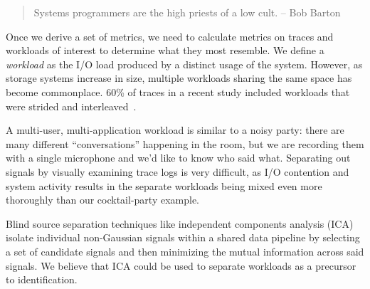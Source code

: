 \begin{quote}
Systems programmers are the high priests of a low cult.
-- Bob Barton
\end{quote}



Once we derive a set of metrics, we need to calculate metrics on traces and
workloads of interest to determine what \mw they most resemble.  We define 
a \textit{workload} as the I/O load produced by a distinct usage of the system.  
However, as storage systems increase in size, multiple workloads sharing the
same space has become commonplace.  
60\% of traces in a recent study included workloads that were strided and
interleaved~\cite{seo_char}.  

 A multi-user, multi-application workload is similar to a
noisy party: there are many different ``conversations'' happening in the room,
but we are recording them with a single microphone and we'd like to know who
said what.  Separating out signals by visually examining trace logs is very
difficult, as I/O contention and system activity results in the separate
workloads being mixed even more thoroughly than our cocktail-party example.

Blind source separation techniques like independent components
analysis (ICA) isolate individual non-Gaussian
signals within a shared data pipeline by selecting a set of candidate signals
and then minimizing the mutual information across said signals.     
We believe that ICA could be used to separate workloads as a precursor to
identification.

